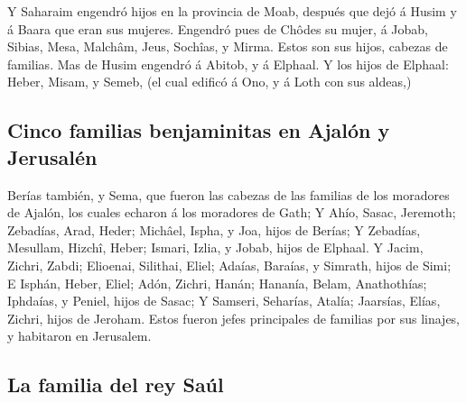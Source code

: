  Y Saharaim engendró hijos en la provincia de Moab, después
que dejó á Husim y á Baara que eran sus mujeres.  Engendró
pues de Chôdes su mujer, á Jobab, Sibias, Mesa, Malchâm, 
Jeus, Sochîas, y Mirma. Estos son sus hijos, cabezas de familias.
 Mas de Husim engendró á Abitob, y á Elphaal. 
Y los hijos de Elphaal: Heber, Misam, y Semeb, (el cual edificó á Ono, y
á Loth con sus aldeas,)

\hypertarget{cinco-familias-benjaminitas-en-ajaluxf3n-y-jerusaluxe9n}{%
\subsection{Cinco familias benjaminitas en Ajalón y
Jerusalén}\label{cinco-familias-benjaminitas-en-ajaluxf3n-y-jerusaluxe9n}}

 Berías también, y Sema, que fueron las cabezas de las
familias de los moradores de Ajalón, los cuales echaron á los moradores
de Gath;  Y Ahío, Sasac, Jeremoth;  Zebadías,
Arad, Heder;  Michâel, Ispha, y Joa, hijos de Berías;
 Y Zebadías, Mesullam, Hizchî, Heber;  Ismari,
Izlia, y Jobab, hijos de Elphaal.  Y Jacim, Zichri, Zabdi;
 Elioenai, Silithai, Eliel;  Adaías, Baraías,
y Simrath, hijos de Simi;  E Isphán, Heber, Eliel;
 Adón, Zichri, Hanán;  Hananía, Belam,
Anathothías;  Iphdaías, y Peniel, hijos de Sasac;
 Y Samseri, Seharías, Atalía;  Jaarsías,
Elías, Zichri, hijos de Jeroham.  Estos fueron jefes
principales de familias por sus linajes, y habitaron en Jerusalem.

\hypertarget{la-familia-del-rey-sauxfal}{%
\subsection{La familia del rey Saúl}\label{la-familia-del-rey-sauxfal}}


